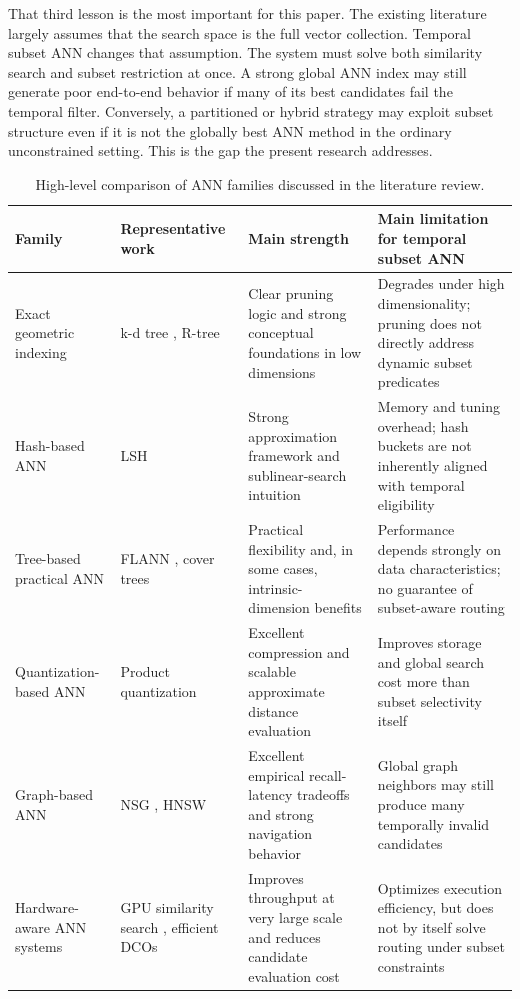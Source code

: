 \documentclass[sigconf,nonacm]{acmart}
\begin{document}
That third lesson is the most important for this paper. The existing literature largely assumes that the search space is the full vector collection. Temporal subset ANN changes that assumption. The system must solve both similarity search and subset restriction at once. A strong global ANN index may still generate poor end-to-end behavior if many of its best candidates fail the temporal filter. Conversely, a partitioned or hybrid strategy may exploit subset structure even if it is not the globally best ANN method in the ordinary unconstrained setting. This is the gap the present research addresses.

\begin{table}[t]
\caption{High-level comparison of ANN families discussed in the literature review.}
\label{tab:litfamilies}
\centering
\small
\begin{tabular}{p{2.4cm}p{3.2cm}p{4.2cm}p{4.8cm}}
\toprule
Family & Representative work & Main strength & Main limitation for temporal subset ANN \\
\midrule
Exact geometric indexing & k-d tree \cite{bentley1975}, R-tree \cite{guttman1984} & Clear pruning logic and strong conceptual foundations in low dimensions & Degrades under high dimensionality; pruning does not directly address dynamic subset predicates \\
Hash-based ANN & LSH \cite{indyk1998,gionis1999} & Strong approximation framework and sublinear-search intuition & Memory and tuning overhead; hash buckets are not inherently aligned with temporal eligibility \\
Tree-based practical ANN & FLANN \cite{muja2014}, cover trees \cite{beygelzimer2006} & Practical flexibility and, in some cases, intrinsic-dimension benefits & Performance depends strongly on data characteristics; no guarantee of subset-aware routing \\
Quantization-based ANN & Product quantization \cite{jegou2011} & Excellent compression and scalable approximate distance evaluation & Improves storage and global search cost more than subset selectivity itself \\
Graph-based ANN & NSG \cite{fu2019}, HNSW \cite{malkov2020} & Excellent empirical recall-latency tradeoffs and strong navigation behavior & Global graph neighbors may still produce many temporally invalid candidates \\
Hardware-aware ANN systems & GPU similarity search \cite{johnson2021}, efficient DCOs \cite{gao2023} & Improves throughput at very large scale and reduces candidate evaluation cost & Optimizes execution efficiency, but does not by itself solve routing under subset constraints \\
\bottomrule
\end{tabular}
\end{table}
\end{document}
